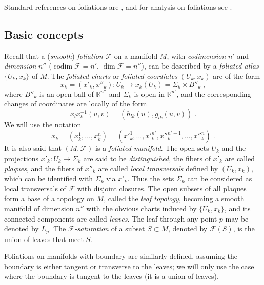\documentclass{memo-l}
\theoremstyle{plain}
\theoremstyle{definition}
\theoremstyle{remark}
\newcommand{\R}{\mathbb{R}}
\newcommand{\FF}{\mathcal{F}}
\newcommand{\codim}{\operatorname{codim}}
\numberwithin{section}{chapter}
\numberwithin{equation}{section}%
\begin{document}
Standard references on foliations are \cite{HectorHirsch1981-A,HectorHirsch1983-B,CamachoLinsNeto1985,Godbillon1991,CandelConlon2000-I,CandelConlon2003-II}, and for analysis on foliations see \cite{Connes1982,MooreSchochet1988}. 

\subsection{Basic concepts}\label{ss: folns}

Recall that a (\emph{smooth}) \emph{foliation}  $\FF$ on a manifold $M$, with \emph{codimension} $n'$ and \emph{dimension} $n''$ ($\codim\FF=n'$, $\dim\FF=n''$), can be described by a \emph{foliated atlas} $\{U_k,x_k\}$ of $M$. The \emph{foliated charts} or \emph{foliated coordiates} $(U_k,x_k)$ are of the form
\begin{equation}\label{x = (x' x'')}
x_k=(x'_k,x''_k):U_k\to x_k(U_k)=\Sigma_k\times B''_k\;,
\end{equation}
where $B''_k$ is an open ball of $\R^{n''}$ and $\Sigma_k$ is open in $\R^{n'}$, and the corresponding changes of coordinates are locally of the form
\begin{equation}\label{changes of foliated coordinates}
x_lx_k^{-1}(u,v)=(h_{lk}(u),g_{lk}(u,v))\;.
\end{equation}
We will use the notation
\[
x_k=(x^1_k,\dots,x^n_k)=(x'^1_k,\dots,x'^{n'}_k,x''^{n'+1}_k,\dots,x''^n_k)\;.
\]
It is also said that $(M,\FF)$ is a \emph{foliated manifold}. The open sets $U_k$ and the projections $x'_k:U_k\to\Sigma_k$ are said to be \emph{distinguished}, the fibers of $x'_k$ are called \emph{plaques}, and the fibers of $x''_k$ are called \emph{local transversals} defined by $(U_k,x_k)$, which can be identified with $\Sigma_k$ via $x'_k$. Thus the sets $\Sigma_k$ can be considered as local transversals of $\FF$ with disjoint closures. The open subsets of all plaques form a base of a topology on $M$, called the \emph{leaf topology}, becoming a smooth manifold of dimension $n''$ with the obvious charts induced by $\{U_k,x_k\}$, and its connected components are called \emph{leaves}. The leaf through any point $p$ may be denoted by $L_p$. The \emph{$\FF$-saturation} of a subset $S\subset M$, denoted by $\FF(S)$, is the union of leaves that meet $S$.

Foliations on manifolds with boundary are similarly defined, assuming the boundary is either tangent or transverse to the leaves; we will only use the case where the boundary is tangent to the leaves (it is a union of leaves).
\end{document}
